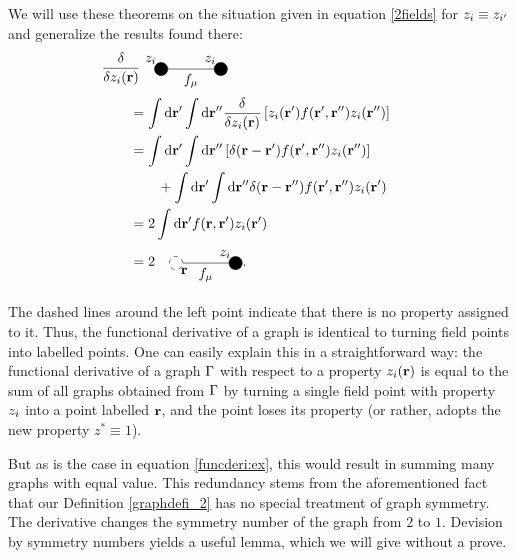 \documentclass[8.5pt,twoside,twocolumn]{article}
\newcommand\di{\te{d}}
\newcommand\dr{\di\r}
\newcommand\zi{\enmat{z_i}}
\newcommand\zip{\enmat{z_{i'}}}
\renewcommand\r{\bo r}
\theoremstyle{standard}
\begin{document}
We will use these theorems on the situation given in equation \eqref{2fields} for $\zi\equiv\zip$ and generalize
the results found there:
\begin{equation} %
\begin{aligned}
&\hspace{-.7cm}\delti{}{\zi(\r)}\begin{tikzpicture}[baseline={(current bounding box.center)}]%
  	\draw (0,0) node[circle,minimum size=0.2cm,draw,fill=black] (A) {};
  	\draw (1.5,0) node[circle,minimum size=0.2cm,draw,fill=black,align=center] (B) {};
  	\draw (A.east) -- node[below]{$f_\mu$} (B.west);
	\node [above left] at (A) {\zi};
	\node [above left] at (B) {\zi};
	\end{tikzpicture}\\
	&= \int \dr' \int \dr'' \delti{}{\zi(\r)} \lt[\zi(\r') f(\r',\r'') \zi(\r'')\rt]\\
&= \int \dr' \int \dr'' \lt[\dl(\r-\r') f(\r',\r'') \zi(\r'')\rt] \\
	&\qquad + \int \dr' \int \dr'' \dl(\r-\r'') f(\r',\r'') \zi(\r') \\
	&= 2 \int \dr' f(\r,\r') \zi(\r') \\
    &=2 \ \ \ \begin{tikzpicture}[baseline={(current bounding box.center)}]%
  	\draw (0,0) node[circle,minimum size=0.2cm,dashed,draw] (A) {};
  	\draw (1.5,0) node[circle,minimum size=0.2cm,draw,fill=black] (B) {};
  	\draw (A.east) -- node[below]{$f_\mu$} (B.west);
	\node [above left] at (B) {\zi};
	\node [below right] at (A) {\r};
	\end{tikzpicture}.
	\label{funcderi:ex}
\end{aligned}
\end{equation}

The dashed lines around the left point indicate that there is no property assigned to it.
Thus, the functional derivative of a graph is identical to turning field points
into labelled points. One can easily explain this in a straightforward way: the functional
derivative of a graph $\Gamma$ with respect to a property $\zi(\r)$ is equal to the sum of all graphs obtained
from $\Gamma$ by turning a single field point with property $\zi$ into a point labelled $\r$, and the
point loses its property (or rather, adopts the new property $z^* \equiv 1$).

But as is the case in equation \eqref{funcderi:ex}, this would result in summing many graphs with equal value.
This redundancy stems from the aforementioned fact that our Definition \ref{graphdefi_2} has no special
treatment of graph symmetry. The derivative changes the symmetry number of the graph from $2$ to $1$. Devision
by symmetry numbers yields a useful lemma, which we will give without a prove.
\end{document}
